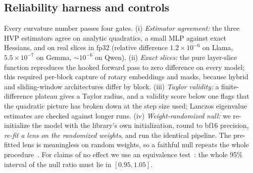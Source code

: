 \documentclass[10pt]{article}
\begin{document}
\subsection{Reliability harness and controls}
Every curvature number passes four gates. (i) \emph{Estimator agreement:} the three HVP estimators agree on analytic quadratics, a small MLP against exact Hessians, and on real slices in fp32 (relative difference $1.2\times10^{-6}$ on Llama, $5.5\times10^{-7}$ on Gemma, $\sim10^{-6}$ on Qwen). (ii) \emph{Exact slices:} the pure layer-slice function reproduces the hooked forward pass to zero difference on every model; this required per-block capture of rotary embeddings and masks, because hybrid and sliding-window architectures differ by block. (iii) \emph{Taylor validity:} a finite-difference plateau gives a Taylor radius, and a validity score below one flags that the quadratic picture has broken down at the step size used; Lanczos eigenvalue estimates are checked against longer runs. (iv) \emph{Weight-randomized null:} we re-initialize the model with the library's own initialization, round to bf16 precision, \emph{re-fit a lens on the randomized weights}, and run the identical pipeline. The pre-fitted lens is meaningless on random weights, so a faithful null repeats the whole procedure~\citep{adebayo2018sanity}. For claims of no effect we use an equivalence test~\citep{lakens2017equivalence}: the whole 95\% interval of the null ratio must lie in $[0.95,1.05]$.
\end{document}
